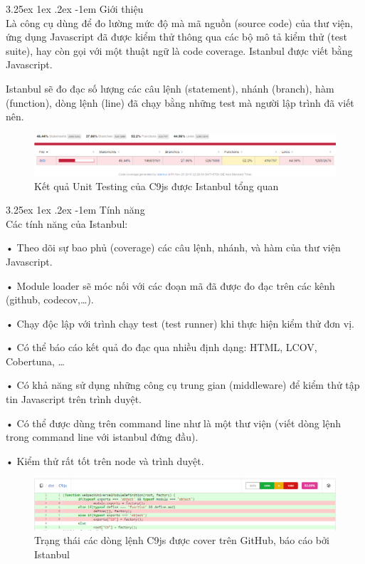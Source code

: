 \documentclass[12pt,a4paper]{article}
\makeatletter
\let\newcounter\@gobble\let\setcounter\@gobbletwo
\newcommand{\myparagraph}[1]{\paragraph{#1}\mbox{}\\} %
\newcounter{subsubsubsection}[subsubsection]
\renewcommand\paragraph{\@startsection{paragraph}{5}{\z@}%
  {3.25ex \@plus1ex \@minus.2ex}%
  {-1em}%
  {\normalfont\normalsize\bfseries}}
\makeatother
\begin{document}
\myparagraph{Giới thiệu}
Là công cụ dùng để đo lường mức độ mà mã nguồn (source code) của thư viện, ứng dụng Javascript đã được kiểm thử thông qua các bộ mô tả kiểm thử (test suite), hay còn gọi với một thuật ngữ là code coverage. Istanbul được viết bằng Javascript.

Istanbul sẽ đo đạc số lượng các câu lệnh (statement), nhánh (branch), hàm (function), dòng lệnh (line) đã chạy bằng những test mà người lập trình đã viết nên.

\begin{figure}[htp]
	\begin{center}
    \includegraphics[scale=.5]{image/istanbul_1}
    \caption{Kết quả Unit Testing của C9js được Istanbul tổng quan}
    \label{fig:istanbul_1}
	\end{center}
\end{figure}

\myparagraph{Tính năng}
Các tính năng của Istanbul:

\begin{list}{}{}
\item[•] Theo dõi sự bao phủ (coverage) các câu lệnh, nhánh, và hàm của thư viện Javascript.
\item[•] Module loader sẽ móc nối với các đoạn mã đã được đo đạc trên các kênh (github, codecov,…).
\item[•] Chạy độc lập với trình chạy test (test runner) khi thực hiện kiểm thử đơn vị.
\item[•] Có thể báo cáo kết quả đo đạc qua nhiều định dạng: HTML, LCOV, Cobertuna, …
\item[•] Có khả năng sử dụng những công cụ trung gian (middleware) để kiểm thử tập tin Javascript trên trình duyệt.
\item[•] Có thể được dùng trên command line như là một thư viện (viết dòng lệnh trong command line với istanbul đứng đầu).
\item[•] Kiểm thử rất tốt trên node và trình duyệt.
\end{list}

\begin{figure}[htp]
	\begin{center}
    \includegraphics[scale=.5]{image/istanbul_2}
    \caption{Trạng thái các dòng lệnh C9js được cover trên GitHub, báo cáo bởi Istanbul}
    \label{fig:istanbul_2}
	\end{center}
\end{figure}
\end{document}
